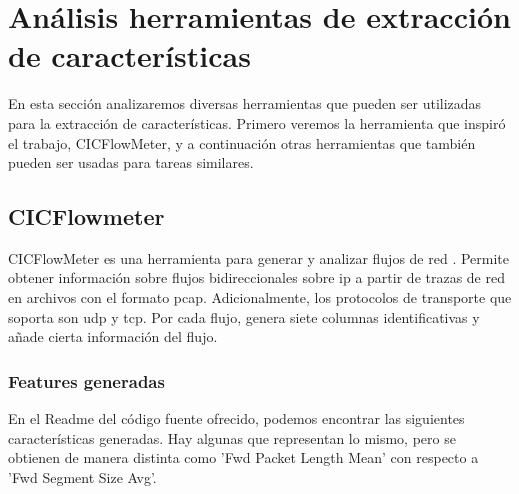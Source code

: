 \section{Análisis herramientas de extracción de características}

En esta sección analizaremos diversas herramientas que pueden ser utilizadas para la extracción de características. Primero veremos la herramienta que inspiró el trabajo, CICFlowMeter, y a continuación otras herramientas que también pueden ser usadas para tareas similares.

\subsection{CICFlowmeter}

CICFlowMeter es una herramienta para generar y analizar flujos de red \cite{cicflowpost} \cite{icissp17} \cite{cicflowrepo}. Permite obtener información sobre flujos bidireccionales sobre \acrshort{ip} a partir de trazas de red en archivos con el formato pcap. Adicionalmente, los protocolos de transporte que soporta son \acrshort{udp} y \acrshort{tcp}. Por cada flujo, genera siete columnas identificativas y añade cierta información del flujo. 

\subsubsection{Features generadas} \label{cicflowfeatures}

En el Readme del código fuente ofrecido, podemos encontrar las siguientes características generadas. Hay algunas que representan lo mismo, pero se obtienen de manera distinta como 'Fwd Packet Length Mean' con respecto a 'Fwd Segment Size Avg'.

